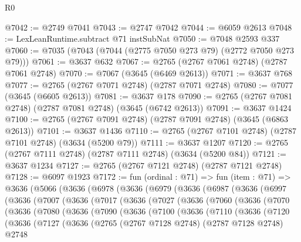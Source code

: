 \begin{lexlean}{R0}
\begin{coremodule}
@7042 := @2749 @7041
@7043 := @2747 @7042
@7044 := @6059 @2613
@7048 := LexLeanRuntime.subtract @71 instSubNat
@7050 := @7048 @2593 @337
@7060 := @7035 (@7043 (@7044 (@2775 @7050 @273 @79) (@2772 @7050 @273 @79)))
@7061 := @3637 @632
@7067 := @2765 (@2767 @7061 @2748) (@2787 @7061 @2748)
@7070 := @7067 (@3645 (@6469 @2613))
@7071 := @3637 @768
@7077 := @2765 (@2767 @7071 @2748) (@2787 @7071 @2748)
@7080 := @7077 (@3645 (@6605 @2613))
@7081 := @3637 @178
@7090 := @2765 (@2767 @7081 @2748) (@2787 @7081 @2748) (@3645 (@6742 @2613))
@7091 := @3637 @1424
@7100 := @2765 (@2767 @7091 @2748) (@2787 @7091 @2748) (@3645 (@6863 @2613))
@7101 := @3637 @1436
@7110 := @2765 (@2767 @7101 @2748) (@2787 @7101 @2748) (@3634 (@5200 @79))
@7111 := @3637 @1207
@7120 := @2765 (@2767 @7111 @2748) (@2787 @7111 @2748) (@3634 (@5200 @84))
@7121 := @3637 @1234
@7127 := @2765 (@2767 @7121 @2748) (@2787 @7121 @2748)
@7128 := @6097 @1923
@7172 := fun (ordinal : @71) =>
  fun (item : @71) =>
  @3636
    (@5066
      (@3636
        (@6978
          (@3636
            (@6979
              (@3636
                (@6987
                  (@3636
                    (@6997
                      (@3636
                        (@7007
                          (@3636
                            (@7017
                              (@3636
                                (@7027
                                  (@3636
                                    (@7060
                                      (@3636
                                        (@7070
                                          (@3636
                                            (@7080
                                              (@3636
                                                (@7090
                                                  (@3636
                                                    (@7100
                                                      (@3636
                                                        (@7110
                                                          (@3636
                                                            (@7120
                                                              (@3636
                                                                (@7127
                                                                  (@3636
                                                                    (@2765
                                                                      (@2767 @7128 @2748)
                                                                      (@2787 @7128 @2748)
                                                                      @2748

\end{coremodule}
\end{lexlean}
